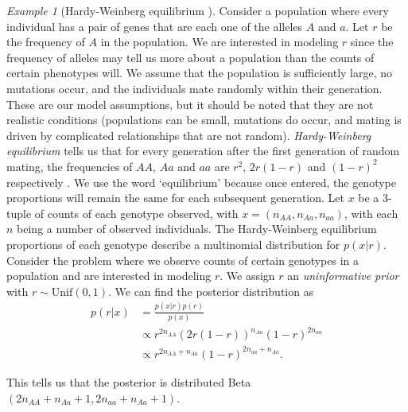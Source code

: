 \documentclass[11pt]{amsart}
\theoremstyle{theorem} %
\theoremstyle{definition}                  %
\theoremstyle{example}                       %
\theoremstyle{remark}                       %
\newtheorem{exmp}[thm]{Example}  %
\numberwithin{equation}{section}
\begin{document}
\begin{exmp}[Hardy-Weinberg equilibrium \cite{stephens}]
    Consider a population where every individual has a pair of genes that are each one of the alleles $A$ and $a$. Let $r$ be the frequency of $A$ in the population. We are interested in modeling $r$ since the frequency of alleles may tell us more about a population than the counts of certain phenotypes will. We assume that the population is sufficiently large, no mutations occur, and the individuals mate randomly within their generation. These are our model assumptions, but it should be noted that they are not realistic conditions (populations can be small, mutations do occur, and mating is driven by complicated relationships that are not random). \emph{Hardy-Weinberg equilibrium} tells us that for every generation after the first generation of random mating, the frequencies of $AA$, $Aa$ and $aa$ are $r^2$, $2r(1-r)$ and $(1-r)^2$ respectively \cite[p.~207]{ross}\cite[p.~35]{gen}. We use the word `equilibrium' because once entered, the genotype proportions will remain the same for each subsequent generation. Let $x$ be a 3-tuple of counts of each genotype observed, with $x=(n_{AA},n_{Aa},n_{aa})$, with each $n$ being a number of observed individuals. The Hardy-Weinberg equilibrium proportions of each genotype describe a multinomial distribution for $p(x|r)$. Consider the problem where we observe counts of certain genotypes in a population and are interested in modeling $r$. We assign $r$ an \emph{uninformative prior} with $r\sim \text{Unif}(0,1)$. We can find the posterior distribution as
    \begin{align*}
        p(r|x)&=\frac{p(x|r)p(r)}{p(x)}\\
        &\propto r^{2n_{AA}} (2r(1-r))^{n_{Aa}} (1-r)^{2n_{aa}}\\
        &\propto r^{2n_{AA}+n_{Aa}}(1-r)^{2n_{aa}+n_{Aa}}.
    \end{align*}
    
    This tells us that the posterior is distributed Beta$(2n_{AA}+n_{Aa}+1,2n_{aa}+n_{Aa}+1)$.
\end{exmp}


\end{document}
